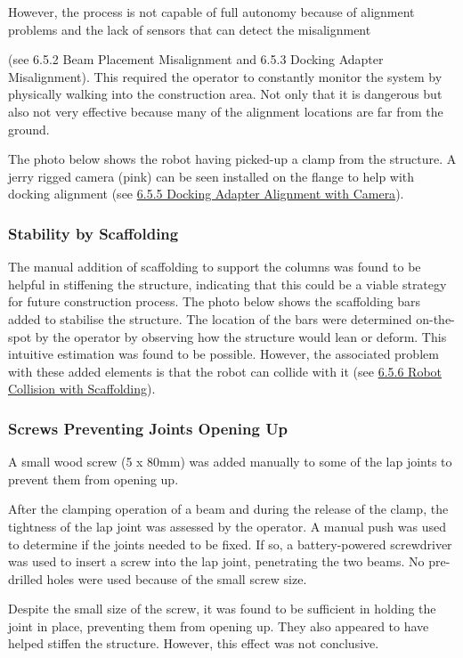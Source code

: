 However, the process is not capable of full autonomy because of alignment problems and the lack of sensors that can detect the misalignment {(see 6.5.2 Beam Placement Misalignment and 6.5.3 Docking Adapter Misalignment). This required the operator to constantly monitor the system by physically walking into the construction area. Not only that it is dangerous but also not very effective because many of the alignment locations are far from the ground. 

The photo below shows the robot having picked-up a clamp from the structure. A jerry rigged camera (pink) can be seen installed on the flange to help with docking alignment (see \ul{6.5.5 Docking Adapter Alignment with Camera}). 




\subsubsection{Stability by Scaffolding}

The manual addition of scaffolding to support the columns was found to be helpful in stiffening the structure, indicating that this could be a viable strategy for future construction process. The photo below shows the scaffolding bars added to stabilise the structure. The location of the bars were determined on-the-spot by the operator by observing how the structure would lean or deform. This intuitive estimation was found to be possible. However, the associated problem with these added elements is that the robot can collide with it (see \ul{6.5.6 Robot Collision with Scaffolding}).




\subsubsection{Screws Preventing Joints Opening Up}

A small wood screw (5 x 80mm) was added manually to some of the lap joints to prevent them from opening up. 

After the clamping operation of a beam and during the release of the clamp, the tightness of the lap joint was assessed by the operator. A manual push was used to determine if the joints needed to be fixed. If so, a battery-powered screwdriver was used to insert a screw into the lap joint, penetrating the two beams. No pre-drilled holes were used because of the small screw size. 

Despite the small size of the screw, it was found to be sufficient in holding the joint in place, preventing them from opening up. They also appeared to have helped stiffen the structure. However, this effect was not conclusive.

}
